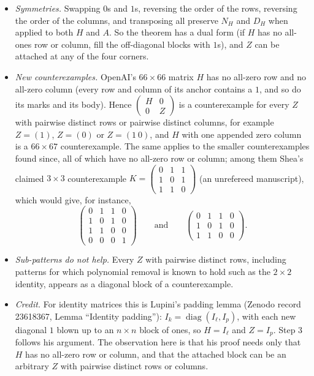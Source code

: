 \documentclass[11pt]{article}
\theoremstyle{plain}
\theoremstyle{definition}
\theoremstyle{remark}
\begin{document}
\begin{itemize}
\item \emph{Symmetries.} Swapping $0$s and $1$s, reversing the order of the rows, reversing the
order of the columns, and transposing all preserve $N_H$ and $D_H$ when applied to both $H$ and
$A$. So the theorem has a dual form (if $H$ has no all-ones row or column, fill the
off-diagonal blocks with $1$s), and $Z$ can be attached at any of the four corners.

\item \emph{New counterexamples.} OpenAI's $66 \times 66$ matrix $H$ has no all-zero row and no
all-zero column (every row and column of its anchor contains a $1$, and so do its marks and its
body). Hence $\begin{pmatrix} H & 0 \\ 0 & Z \end{pmatrix}$ is a counterexample for every $Z$
with pairwise distinct rows or pairwise distinct columns, for example $Z = (1)$, $Z = (0)$ or
$Z = (1\ 0)$, and $H$ with one appended zero column is a $66 \times 67$ counterexample. The same
applies to the smaller counterexamples found since, all of which have no all-zero row or column;
among them Shea's claimed $3 \times 3$ counterexample
$K = \begin{pmatrix} 0&1&1\\1&0&1\\1&1&0 \end{pmatrix}$ (an unrefereed manuscript), which
would give, for instance,
\[
\begin{pmatrix} 0&1&1&0\\1&0&1&0\\1&1&0&0\\0&0&0&1 \end{pmatrix}
\qquad\text{and}\qquad
\begin{pmatrix} 0&1&1&0\\1&0&1&0\\1&1&0&0 \end{pmatrix}.
\]

\item \emph{Sub-patterns do not help.} Every $Z$ with pairwise distinct rows, including patterns
for which polynomial removal is known to hold such as the $2 \times 2$ identity, appears as a
diagonal block of a counterexample.

\item \emph{Credit.} For identity matrices this is Lupini's padding lemma (Zenodo record
23618367, Lemma ``Identity padding''): $I_k = \operatorname{diag}(I_\ell, I_p)$, with each new
diagonal $1$ blown up to an $n \times n$ block of ones, so $H = I_\ell$ and $Z = I_p$. Step 3
follows his argument. The observation here is that his proof needs only that $H$ has no
all-zero row or column, and that the attached block can be an arbitrary $Z$ with pairwise
distinct rows or columns.


\end{itemize}
\end{document}
